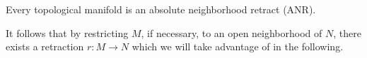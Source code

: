 Every topological manifold is an absolute neighborhood retract (ANR).

It follows that by restricting $M$, if necessary, to an open neighborhood of $N$,
there exists a retraction $r: M \to N$ which we will take advantage of in the following.